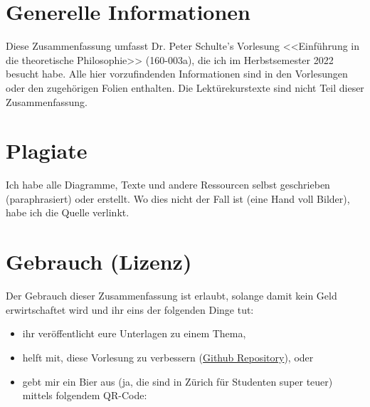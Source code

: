 \documentclass[../main.tex]{subfiles}
\begin{document}
\section{Generelle Informationen}
Diese Zusammenfassung umfasst Dr. Peter Schulte's Vorlesung <<Einführung in die theoretische Philosophie>> (160-003a), die ich im Herbstsemester 2022 besucht habe. Alle hier vorzufindenden Informationen sind in den Vorlesungen oder den zugehörigen Folien enthalten. Die Lektürekurstexte sind nicht Teil dieser Zusammenfassung. 

\section{Plagiate}
Ich habe alle Diagramme, Texte und andere Ressourcen selbst geschrieben (paraphrasiert) oder erstellt. Wo dies nicht der Fall ist (eine Hand voll Bilder), habe ich die Quelle verlinkt. 

\section{Gebrauch (Lizenz)}
 Der Gebrauch dieser Zusammenfassung ist erlaubt, solange damit kein Geld erwirtschaftet wird und ihr eins der folgenden Dinge tut:
\begin{itemize}
	\item ihr veröffentlicht eure Unterlagen zu einem Thema,
	\item helft mit, diese Vorlesung zu verbessern (\href{https://github.com/AndrinGautschi/uzh_einf_theoretische_philosophie}{Github Repository}), oder
	\item gebt mir ein Bier aus (ja, die sind in Zürich für Studenten super teuer) mittels folgendem QR-Code:

	\begin{minipage}[t]{\linewidth}
          \raggedright
    \end{minipage}
\end{itemize}
\end{document}
